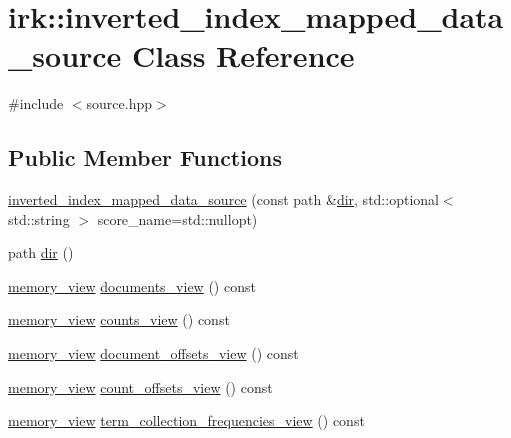 \hypertarget{classirk_1_1inverted__index__mapped__data__source}{}\section{irk\+:\+:inverted\+\_\+index\+\_\+mapped\+\_\+data\+\_\+source Class Reference}
\label{classirk_1_1inverted__index__mapped__data__source}


{\ttfamily \#include $<$source.\+hpp$>$}

\subsection*{Public Member Functions}
\begin{DoxyCompactItemize}
\item 
\mbox{\hyperlink{classirk_1_1inverted__index__mapped__data__source_a774382793af44f7906389b49a46862d3}{inverted\+\_\+index\+\_\+mapped\+\_\+data\+\_\+source}} (const path \&\mbox{\hyperlink{classirk_1_1inverted__index__mapped__data__source_a21a15131eceb3df3360d6dbb0c11929c}{dir}}, std\+::optional$<$ std\+::string $>$ score\+\_\+name=std\+::nullopt)
\item 
path \mbox{\hyperlink{classirk_1_1inverted__index__mapped__data__source_a21a15131eceb3df3360d6dbb0c11929c}{dir}} ()
\item 
\mbox{\hyperlink{classirk_1_1memory__view}{memory\+\_\+view}} \mbox{\hyperlink{classirk_1_1inverted__index__mapped__data__source_ab5533a5c286248ca6a8942bc752d8855}{documents\+\_\+view}} () const
\item 
\mbox{\hyperlink{classirk_1_1memory__view}{memory\+\_\+view}} \mbox{\hyperlink{classirk_1_1inverted__index__mapped__data__source_ae467165a01feebb9fe7fef7a20b4f051}{counts\+\_\+view}} () const
\item 
\mbox{\hyperlink{classirk_1_1memory__view}{memory\+\_\+view}} \mbox{\hyperlink{classirk_1_1inverted__index__mapped__data__source_a70c31d1f739789ee9586a6c93e2ea9e2}{document\+\_\+offsets\+\_\+view}} () const
\item 
\mbox{\hyperlink{classirk_1_1memory__view}{memory\+\_\+view}} \mbox{\hyperlink{classirk_1_1inverted__index__mapped__data__source_a68757ea5653b8f02d661c286f0cce9de}{count\+\_\+offsets\+\_\+view}} () const
\item 
\mbox{\hyperlink{classirk_1_1memory__view}{memory\+\_\+view}} \mbox{\hyperlink{classirk_1_1inverted__index__mapped__data__source_a78df30e6626d6a198f2ed4c5cc0dabdb}{term\+\_\+collection\+\_\+frequencies\+\_\+view}} () const

\end{DoxyCompactItemize}

